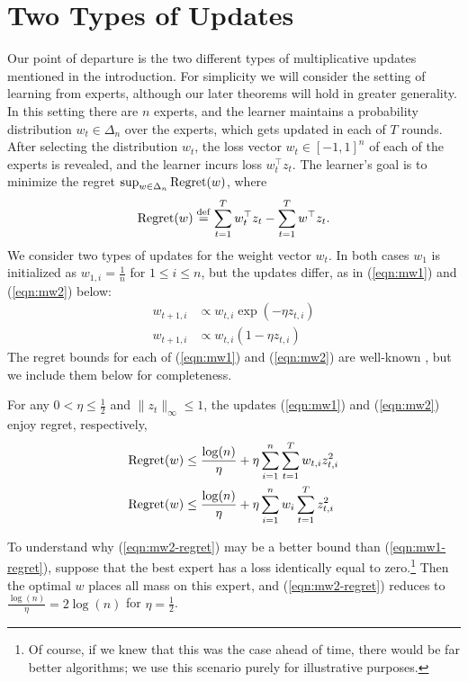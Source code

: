 \documentclass[paper_icml.tex]{subfiles}
\begin{document}
\section{Two Types of Updates} 
\label{sec:mw12}
Our point of departure is the two different types of multiplicative updates 
mentioned in the introduction. For simplicity we will consider the setting of 
learning from experts, although our later theorems will hold in greater 
generality. In this setting there are $n$ experts, and the learner maintains a 
probability distribution $w_t \in \Delta_n$ over the experts, which gets 
updated in each of $T$ rounds. After selecting the distribution $w_t$, 
the loss vector $w_t \in [-1,1]^n$ of each of the experts is revealed, and the 
learner incurs loss $w_t^{\top}z_t$. The learner's goal is to minimize 
the regret $\sup_{w \in \Delta_n} \operatorname{Regret}(w)$, where
\[ \operatorname{Regret}(w) \stackrel{\mathrm{def}}{=} \sum_{t=1}^T w_t^{\top}z_t - \sum_{t=1}^T w^{\top}z_t. \]
We consider two types of updates for the weight vector $w_t$. In both cases 
$w_1$ is initialized as $w_{1,i} = \frac{1}{n}$ for $1 \leq i \leq n$, but 
the updates differ, as in (\ref{eqn:mw1}) and (\ref{eqn:mw2}) below:
\begin{align}
\label{eqn:mw1}
w_{t+1,i} &\propto w_{t,i}\exp(-\eta z_{t,i}) \tag{MW1}\\
\label{eqn:mw2}
w_{t+1,i} &\propto w_{t,i}(1-\eta z_{t,i}) \tag{MW2}
\end{align}
The regret bounds for each of (\ref{eqn:mw1}) and (\ref{eqn:mw2}) are 
well-known \cite{shalev2011, cesa2007}, but we include them below for completeness.
\begin{theorem}
\label{thm:mw12}
For any $0 < \eta \leq \frac{1}{2}$ and $\|z_t\|_{\infty} \leq 1$, the updates (\ref{eqn:mw1}) and 
(\ref{eqn:mw2}) enjoy regret, respectively,
\begin{align}
\label{eqn:mw1-regret}
\Regret(w) &\leq \frac{\log(n)}{\eta} + \eta \sum_{i=1}^n \sum_{t=1}^T w_{t,i}z_{t,i}^2 %
 \\
\label{eqn:mw2-regret}
\Regret(w) &\leq \frac{\log(n)}{\eta} + \eta \sum_{i=1}^n w_i \sum_{t=1}^T z_{t,i}^2 %
\end{align}
\end{theorem}
To understand why (\ref{eqn:mw2-regret}) may be a better bound than 
(\ref{eqn:mw1-regret}), suppose that the best expert has a loss identically 
equal to zero.\footnote{Of course, if we knew that this was the case ahead of 
time, there would be far better algorithms; we use this scenario purely for 
illustrative purposes.} Then the optimal $w$ places all mass on this expert, 
and (\ref{eqn:mw2-regret}) reduces to $\frac{\log(n)}{\eta} = 2\log(n)$ for 
$\eta = \frac{1}{2}$.
\end{document}
